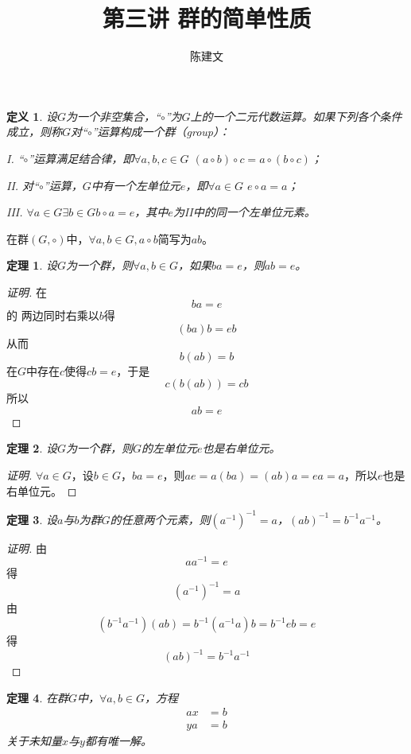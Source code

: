 \documentclass{article}
\newtheorem{Def}{定义}
\newtheorem{Thm}{定理}
\begin{document}
\begin{CJK*}{UTF8}{gbsn}
  \title{第三讲 群的简单性质}
  \author{陈建文}
  \maketitle
  
  \begin{Def}
    设$G$为一个非空集合，“$\circ$”为$G$上的一个二元代数运算。如果下列各个条件成立，则称$G$对“$\circ$”运算构成一个群（group）：
  
    I. “$\circ$”运算满足结合律，即$\forall a,b,c \in G$ $(a\circ b)\circ c = a\circ(b\circ c)$；
  
    II. 对“$\circ$”运算，$G$中有一个左单位元$e$，即$\forall a\in G$ $e\circ a = a$；
  
    III. $\forall a\in G \exists b\in G b\circ a = e$，其中$e$为II中的同一个左单位元素。
  \end{Def}
  在群$(G,\circ)$中，$\forall a,b\in G, a\circ b$简写为$ab$。
  \begin{Thm}
    设$G$为一个群，则$\forall a,b\in G$，如果$ba=e$，则$ab=e$。
  \end{Thm}
  \begin{proof}[证明]
    在\[ba=e\]的
    两边同时右乘以$b$得
    \[(ba)b=eb\]
    从而
    \[b(ab)=b\]
    在$G$中存在$c$使得$cb=e$，于是
    \[c(b(ab))=cb\]
    所以
    \[ab=e\]
  \end{proof}
  \begin{Thm}
    设$G$为一个群，则$G$的左单位元$e$也是右单位元。
  \end{Thm}
  \begin{proof}[证明]
    $\forall a\in G$，设$b\in G$，$ba=e$，则$ae=a(ba)=(ab)a=ea=a$，所以$e$也是右单位元。
  \end{proof}
  \begin{Thm}
    设$a$与$b$为群$G$的任意两个元素，则$(a^{-1})^{-1}=a$，$(ab)^{-1}=b^{-1}a^{-1}$。
  \end{Thm}
  \begin{proof}[证明]
    由\[aa^{-1}=e\]
    得\[(a^{-1})^{-1}=a\]
  由\[(b^{-1}a^{-1})(ab)=b^{-1}(a^{-1}a)b=b^{-1}eb=e\]
  得\[(ab)^{-1}=b^{-1}a^{-1}\]
  \end{proof}
  \begin{Thm}
   在群$G$中，$\forall a, b \in G$，方程
   \begin{align*}
    ax&=b\\
    ya&=b
   \end{align*}
   关于未知量$x$与$y$都有唯一解。 
  \end{Thm}
  

\end{CJK*}
\end{document}
